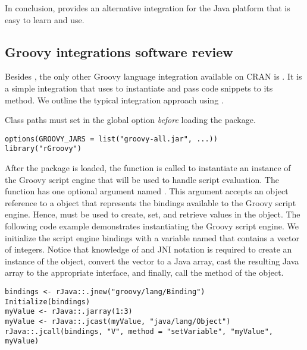 In conclusion,  provides an alternative integration for the Java platform that is easy to learn and use.

\hypertarget{groovy-integrations}{}
\subsection{Groovy integrations software review}

Besides , the only other Groovy language integration available on CRAN is  \citep{rgroovy}. It is a simple integration that uses  to instantiate  and pass code snippets to its  method. We outline the typical integration approach using .

Class paths must set in the global option  \textit{before} loading the  package.

\begin{verbatim}
options(GROOVY_JARS = list("groovy-all.jar", ...))
library("rGroovy")
\end{verbatim}

After the package is loaded, the  function is called to instantiate an instance of the Groovy script engine that will be used to handle script evaluation. The  function has one optional argument named . This argument accepts an  object reference to a  object that represents the bindings available to the Groovy script engine. Hence,  must be used to create, set, and retrieve values in the  object. The following code example demonstrates instantiating the Groovy script engine. We initialize the script engine bindings with a variable named  that contains a vector of integers. Notice that knowledge of  and JNI notation is required to create an instance of the  object, convert the vector to a Java array, cast the resulting Java array to the appropriate interface, and finally, call the  method of the  object.

\begin{verbatim}
bindings <- rJava::.jnew("groovy/lang/Binding")
Initialize(bindings)
myValue <- rJava::.jarray(1:3)
myValue <- rJava::.jcast(myValue, "java/lang/Object")
rJava::.jcall(bindings, "V", method = "setVariable", "myValue", myValue)
\end{verbatim}

